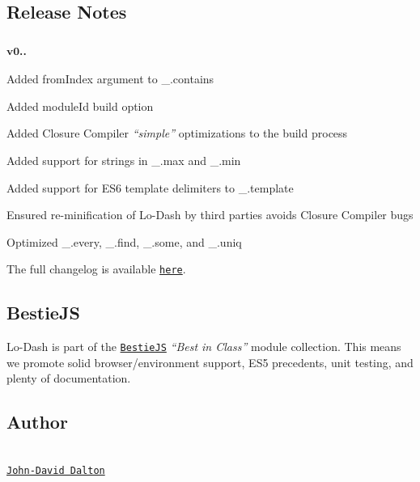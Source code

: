 \subsection*{Release Notes}

\subsubsection*{\textsuperscript{v0..}}


\begin{DoxyItemize}
\item Added {\ttfamily from\+Index} argument to {\ttfamily \+\_\+.\+contains}
\item Added {\ttfamily module\+Id} build option
\item Added Closure Compiler {\itshape “simple”} optimizations to the build process
\item Added support for strings in {\ttfamily \+\_\+.\+max} and {\ttfamily \+\_\+.\+min}
\item Added support for E\+S6 template delimiters to {\ttfamily \+\_\+.\+template}
\item Ensured re-\/minification of Lo-\/\+Dash by third parties avoids Closure Compiler bugs
\item Optimized {\ttfamily \+\_\+.\+every}, {\ttfamily \+\_\+.\+find}, {\ttfamily \+\_\+.\+some}, and {\ttfamily \+\_\+.\+uniq}
\end{DoxyItemize}

The full changelog is available \href{https://github.com/lodash/lodash/wiki/Changelog}{\tt here}.

\subsection*{Bestie\+J\+S}

Lo-\/\+Dash is part of the \href{https://github.com/bestiejs}{\tt Bestie\+J\+S} {\itshape “\+Best in Class”} module collection. This means we promote solid browser/environment support, E\+S5 precedents, unit testing, and plenty of documentation.

\subsection*{Author}

\begin{TabularC}{1}
\hline
{}\\
\href{http://allyoucanleet.com/}{\tt John-\/\+David Dalton} \\
\end{TabularC}
